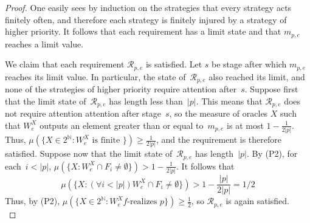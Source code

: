 \documentclass{article}
\numberwithin{theorem}{section}
\newcommand{\R}{\mathcal{R}}
\newcommand{\cs}{2^{\NN}}
\newcommand{\NN}[0]{\mathbb{N}}
\begin{document}
\begin{proof}






One easily sees by induction on the strategies that every strategy acts finitely often, and therefore each strategy is finitely injured by a strategy of higher priority. It follows that each requirement has a limit state and that $m_{p,e}$ reaches a limit value.

We claim that each requirement $\R_{p,e}$ is satisfied. Let $s$ be stage after which $m_{p, e}$ reaches its limit value. In particular, the state of~$\R_{p, e}$ also reached its limit, and none of the strategies of higher priority require attention after~$s$. Suppose first that the limit state of~$\R_{p, e}$ has length less than~$|p|$. This means that $\R_{p, e}$ does not require attention attention after stage~$s$, so the measure of oracles $X$ such that $W_e^X$ outputs an element greater than or equal to~$m_{p,e}$ is at most $1-\frac{1}{2|p|}$. Thus, $\mu(\{ X \in \cs : W_e^X \mbox{ is finite } \}) \geq \frac{1}{2|p|}$, and the requirement is therefore satisfied. Suppose now that the limit state of~$\R_{p,e}$ has length~$|p|$. By (P2), for each~$i < |p|$, $\mu(\{ X : W_e^X \cap F_i \neq \emptyset \}) > 1-\frac{1}{2|p|}$. It follows that 
$$
\mu(\{ X : (\forall i < |p|) W_e^X \cap F_i \neq \emptyset \}) > 1-\frac{|p|}{2|p|} = 1/2
$$
Thus, by (P2), $\mu(\{ X \in \cs : W_e^X f\mbox{-realizes } p \}) \geq \frac{1}{2}$, so $\R_{p,e}$ is again satisfied. \\


\end{proof}
\end{document}
